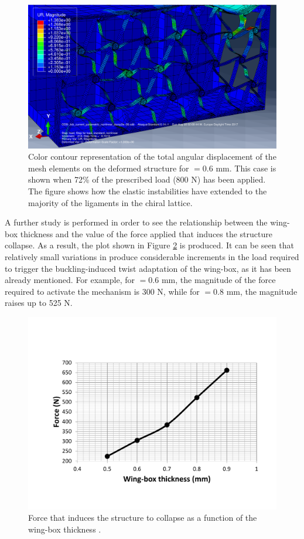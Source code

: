     \begin{figure}[!htpb] %
      \centering
      \includegraphics[width=0.8 \textwidth]{figures/result-sim/cbox/0coma6-800N-2}
      \caption[Color contour representation of the total angular displacement of the mesh elements on the deformed structure for \boxt$ = 0.6$ mm]{Color contour representation of the total angular displacement of the mesh elements on the deformed structure for \boxt$ = 0.6$ mm. This case is shown when 72\% of the prescribed load (800 N) has been applied. The figure shows how the elastic instabilities have extended to the majority of the ligaments in the chiral lattice.}\label{fig:0coma6-800N-cbox_t}
    \end{figure}

    A further study is performed in order to see the relationship between the wing-box thickness and the value of the force applied that induces the structure collapse. As a result, the plot shown in Figure \ref{fig:force_cbox_t} is produced. It can be seen that relatively small variations in \boxt produce considerable increments in the load required to trigger the buckling-induced twist adaptation of the wing-box, as it has been already mentioned. For example, for \boxt$ = 0.6$ mm, the magnitude of the force required to activate the mechanism is 300 N, while for \boxt$ = 0.8$ mm, the magnitude raises up to 525 N.

    \begin{figure}[!htpb] %
      \centering
      \includegraphics[width=0.8 \textwidth]{figures/result-sim/cbox/force_cbox_t}
      \caption[Force that induces the structure to collapse as a function of the wing-box thickness]{Force that induces the structure to collapse as a function of the wing-box thickness \boxt.}\label{fig:force_cbox_t}
    \end{figure}

